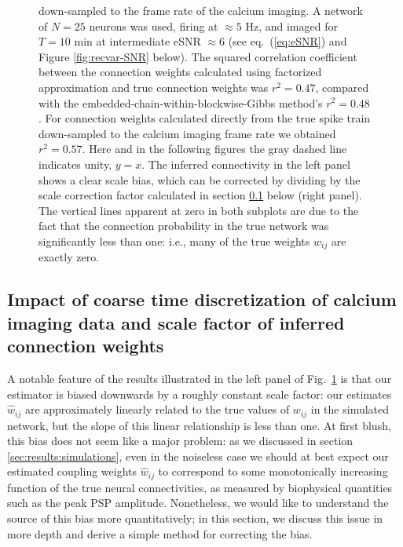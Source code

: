 \documentclass[aoas,preprint]{imsart}
\begin{document}
\begin{figure}[t!]
{down-sampled to the frame rate of the calcium imaging. A network of
$N=25$ neurons was used, firing at $\approx 5$ Hz, and imaged for
$T=10$ min at intermediate eSNR $\approx 6$ (see eq.~(\ref{eq:eSNR})
and Figure \ref{fig:recvar-SNR} below).  The squared correlation
coefficient between the connection weights calculated using factorized
approximation and true connection weights was $r^2=0.47$, compared
with the embedded-chain-within-blockwise-Gibbs method's
$r^2=0.48$. For connection weights calculated directly from the true
spike train down-sampled to the calcium imaging frame rate we obtained
$r^2=0.57$.  Here and in the following figures the gray dashed line
indicates unity, $y=x$.  The inferred connectivity in the left panel
shows a clear scale bias, which can be corrected by dividing by the
scale correction factor calculated in section \ref{sec:scale} below
(right panel).  The vertical lines apparent at zero in both subplots
are due to the fact that the connection probability in the true
network was significantly less than one: i.e., many of the true
weights $w_{ij}$ are exactly zero.}
\label{fig:scatters} \end{figure}


\subsection{Impact of coarse time discretization of calcium imaging
  data and scale factor of inferred connection weights}
\label{sec:scale}

A notable feature of the results illustrated in the left panel of
Fig.~\ref{fig:scatters} is that our estimator is biased downwards by a
roughly constant scale factor: our estimates $\hat w_{ij}$ are
approximately linearly related to the true values of $w_{ij}$ in the
simulated network, but the slope of this linear relationship is less
than one.  At first blush, this bias does not seem like a major
problem: as we discussed in section \ref{sec:results:simulations},
even in the noiseless case we should at best expect our estimated
coupling weights $\hat w_{ij}$ to correspond to some monotonically
increasing function of the true neural connectivities, as measured by
biophysical quantities such as the peak PSP amplitude.  Nonetheless,
we would like to understand the source of this bias more
quantitatively; in this section, we discuss this issue in more depth
and derive a simple method for correcting the bias.
\end{document}
